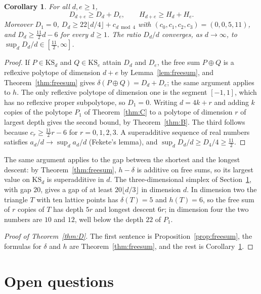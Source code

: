 \documentclass[11pt]{amsart}
\newtheorem{corollary}[theorem]{Corollary}
\theoremstyle{definition}
\theoremstyle{remark}
\newcommand{\KS}{\mathrm{KS}}
\newcommand{\LB}{22}
\begin{document}
\begin{corollary}\label{cor:superadditive}
For all $d,e\ge1$,
\[
D_{d+e}\ge D_d+D_e,\qquad H_{d+e}\ge H_d+H_e .
\]
Moreover $D_1=0$, $D_d\ge22\lfloor d/4\rfloor+c_{d\bmod4}$ with
$(c_0,c_1,c_2,c_3)=(0,0,5,11)$, and $D_d\ge\tfrac{11}{2}d-6$ for every
$d\ge1$. The ratio $D_d/d$ converges, as $d\to\infty$, to
$\sup_dD_d/d\in[\tfrac{11}{2},\infty]$.
\end{corollary}

\begin{proof}
If $P\in\KS_d$ and $Q\in\KS_e$ attain $D_d$ and $D_e$, the free sum
$P\oplus Q$ is a reflexive polytope of dimension $d+e$ by
Lemma~\ref{lem:freesum}, and Theorem~\ref{thm:freesum} gives
$\delta(P\oplus Q)=D_d+D_e$; the same argument applies to $h$. The only
reflexive polytope of dimension one is the segment $[-1,1]$, which has no
reflexive proper subpolytope, so $D_1=0$. Writing $d=4k+r$ and adding $k$
copies of the polytope $P_1$ of Theorem~\ref{thm:C} to a polytope of
dimension $r$ of largest depth gives the second bound, by
Theorem~\ref{thm:B}. The third follows because $c_r\ge\frac{11}{2}r-6$
for $r=0,1,2,3$. A superadditive sequence of real numbers satisfies
$a_d/d\to\sup_da_d/d$ (Fekete's lemma), and $\sup_dD_d/d\ge D_4/4\ge
\frac{11}{2}$.
\end{proof}

The same argument applies to the gap between the shortest and the longest
descent: by Theorem~\ref{thm:freesum}, $h-\delta$ is additive on free
sums, so its largest value on $\KS_d$ is superadditive in $d$. The
three-dimensional simplex of Section~\ref{sec:open}, with gap $20$, gives
a gap of at least $20\lfloor d/3\rfloor$ in dimension $d$. In dimension
two the triangle $T$ with ten lattice points has $\delta(T)=5$ and
$h(T)=6$, so the free sum of $r$ copies of $T$ has depth $5r$ and longest
descent $6r$; in dimension four the two numbers are $10$ and $12$, well
below the depth $\LB$ of $P_1$.

\begin{proof}[Proof of Theorem~\ref{thm:D}]
The first sentence is Proposition~\ref{prop:freesum}, the formulas for
$\delta$ and $h$ are Theorem~\ref{thm:freesum}, and the rest is
Corollary~\ref{cor:superadditive}.
\end{proof}
\section{Open questions}\label{sec:open}
\end{document}
